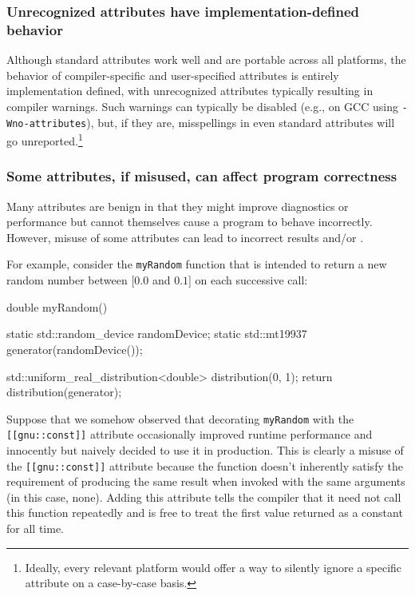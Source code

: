 \subsubsection[Unrecognized attributes have implementation-defined behavior]{Unrecognized attributes have implementation-defined behavior}\label{unrecognized-attributes-have-implementation-defined-behavior}

Although standard attributes work well and are portable across all
platforms, the behavior of compiler-specific and user-specified
attributes is entirely implementation defined, with unrecognized
attributes typically resulting in compiler warnings. Such warnings can typically be disabled (e.g., on GCC using
\lstinline!-Wno-attributes!), but, if they are, misspellings in even standard
attributes will go unreported.{\cprotect\footnote{Ideally, every relevant platform would offer a way to silently ignore a specific
  attribute on a case-by-case basis.}}

\subsubsection[Some attributes, if misused, can affect program correctness]{Some attributes, if misused, can affect program correctness}\label{some-attributes,-if-misused,-can-affect-program-correctness}

Many attributes are benign in that they might improve diagnostics or
performance but cannot themselves cause a program to behave incorrectly.
However, misuse of some attributes can lead to incorrect
results and/or .

For example, consider the \lstinline!myRandom! function that is intended to
return a new random number between $[0.0$ and $0.1]$ on each successive
call:

\begin{emcppslisting}[language=C++]
double myRandom()
{
    static std::random_device randomDevice;
    static std::mt19937 generator(randomDevice());

    std::uniform_real_distribution<double> distribution(0, 1);
    return distribution(generator);
}
\end{emcppslisting}

\noindent Suppose that we somehow observed that decorating \lstinline!myRandom! with
the \lstinline![[gnu::const]]! attribute occasionally improved runtime
performance and innocently but naively decided to use it in production. This
is clearly a misuse of the \lstinline![[gnu::const]]! attribute because the
function doesn't inherently satisfy the requirement of producing the
same result when invoked with the same arguments (in this case, none).
Adding this attribute tells the compiler that it need not call this
function repeatedly and is free to treat the first value returned as a
constant for all time.

